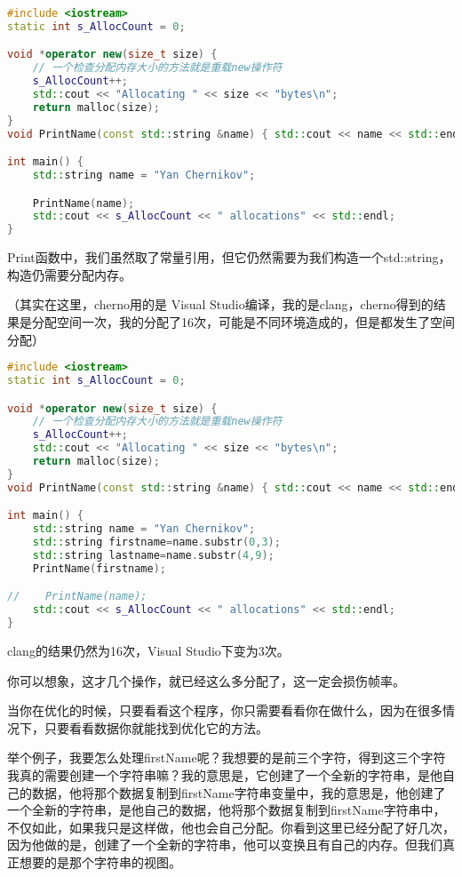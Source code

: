 \begin{lstlisting}[language=c++]
#include <iostream>
static int s_AllocCount = 0;

void *operator new(size_t size) {
    // 一个检查分配内存大小的方法就是重载new操作符
    s_AllocCount++;
    std::cout << "Allocating " << size << "bytes\n";
    return malloc(size);
}
void PrintName(const std::string &name) { std::cout << name << std::endl; }

int main() {
    std::string name = "Yan Chernikov";

    PrintName(name);
    std::cout << s_AllocCount << " allocations" << std::endl;
}
\end{lstlisting}

{\ncodestyle Print}函数中，我们虽然取了常量引用，但它仍然需要为我们构造一个{\ncodestyle  std::string}，构造仍需要分配内存。

（其实在这里，cherno用的是 Visual Studio编译，我的是clang，cherno得到的结果是分配空间一次，我的分配了16次，可能是不同环境造成的，但是都发生了空间分配）

\begin{lstlisting}[language=c++]
#include <iostream>
static int s_AllocCount = 0;

void *operator new(size_t size) {
    // 一个检查分配内存大小的方法就是重载new操作符
    s_AllocCount++;
    std::cout << "Allocating " << size << "bytes\n";
    return malloc(size);
}
void PrintName(const std::string &name) { std::cout << name << std::endl; }

int main() {
    std::string name = "Yan Chernikov";
    std::string firstname=name.substr(0,3);
    std::string lastname=name.substr(4,9);
    PrintName(firstname);

//    PrintName(name);
    std::cout << s_AllocCount << " allocations" << std::endl;
}
\end{lstlisting}

clang的结果仍然为16次，Visual Studio下变为3次。

你可以想象，这才几个操作，就已经这么多分配了，这一定会损伤帧率。

当你在优化的时候，只要看看这个程序，你只需要看看你在做什么，因为在很多情况下，只要看看数据你就能找到优化它的方法。

举个例子，我要怎么处理{\ncodestyle firstName}呢？我想要的是前三个字符，得到这三个字符我真的需要创建一个字符串嘛？我的意思是，它创建了一个全新的字符串，是他自己的数据，他将那个数据复制到{\ncodestyle firstName}字符串变量中，我的意思是，他创建了一个全新的字符串，是他自己的数据，他将那个数据复制到{\ncodestyle firstName}字符串中，不仅如此，如果我只是这样做，他也会自己分配。你看到这里已经分配了好几次，因为他做的是，创建了一个全新的字符串，他可以变换且有自己的内存。但我们真正想要的是那个字符串的视图。

